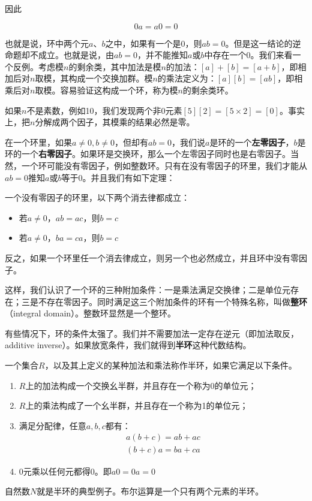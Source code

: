 \documentclass[b5paper]{ctexart}
\begin{document}
因此

\[
0 a = a 0 = 0
\]

也就是说，环中两个元$a$、$b$之中，如果有一个是0，则$ab = 0$。但是这一结论的逆命题却不成立。也就是说，由$ab = 0$，并不能推知$a$或$b$中存在一个0。我们来看一个反例。考虑模$n$的剩余类，其中加法是模$n$的加法：$[a] + [b] = [a + b]$，即相加后对$n$取模，其构成一个交换加群。模$n$的乘法定义为：$[a][b] = [ab]$，即相乘后对$n$取模。容易验证这构成一个环，称为模$n$的剩余类环。

如果$n$不是素数，例如10，我们发现两个非0元素$[5][2] = [5 \times 2] = [0]$。事实上，把$n$分解成两个因子，其模乘的结果必然是零。

在一个环里，如果$a \neq 0, b \neq 0$，但却有$ab = 0$，我们说$a$是环的一个\textbf{左零因子}，$b$是环的一个\textbf{右零因子}。如果环是交换环，那么一个左零因子同时也是右零因子。当然，一个环可能没有零因子，例如整数环。只有在没有零因子的环里，我们才能从$ab = 0$推知$a$或$b$等于0。并且我们有如下定理：

\begin{theorem}
一个没有零因子的环里，以下两个消去律都成立：
\begin{itemize}
\item 若$a \neq 0$，$ab = ac$，则$b = c$
\item 若$a \neq 0$，$ba = ca$，则$b = c$
\end{itemize}
\end{theorem}

反之，如果一个环里任一个消去律成立，则另一个也必然成立，并且环中没有零因子。

这样，我们认识了一个环的三种附加条件：一是乘法满足交换律；二是单位元存在；三是不存在零因子。同时满足这三个附加条件的环有一个特殊名称，叫做\textbf{整环}（integral domain）。整数环显然是一个整环。

有些情况下，环的条件太强了。我们并不需要加法一定存在逆元（即加法取反，additive inverse）。如果放宽条件，我们就得到\textbf{半环}这种代数结构。

\begin{definition}
一个集合$R$，以及其上定义的某种加法和乘法称作半环，如果它满足以下条件。
\begin{enumerate}
\item $R$上的加法构成一个交换幺半群，并且存在一个称为0的单位元；
\item $R$上的乘法构成了一个幺半群，并且存在一个称为1的单位元；
\item 满足分配律，任意$a, b, c$都有：
\[
\begin{array}{l}
a(b + c) = ab + ac \\
(b + c)a = ba + ca
\end{array}
\]
\item 0元乘以任何元都得0。即$a0 = 0a = 0$
\end{enumerate}
\end{definition}
自然数$N$就是半环的典型例子。布尔运算是一个只有两个元素的半环。
\end{document}
